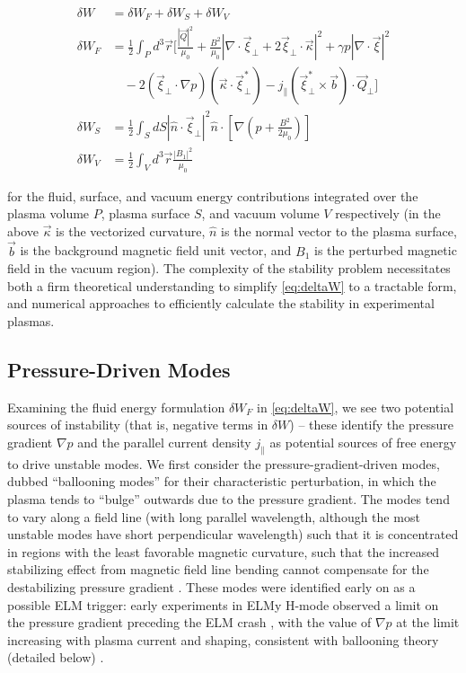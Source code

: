 \begin{equation}\label{eq:deltaW}
 \begin{aligned}
  \delta W &= \delta W_F + \delta W_S + \delta W_V\\
  \delta W_F &= \frac{1}{2} \int_P d^3 \vec{r} \Bigg[ \frac{|\vec{Q}|^2}{\mu_0} + \frac{B^2}{\mu_0} \left| \nabla \cdot \vec{\xi}_\perp + 2 \vec{\xi}_\perp \cdot \vec{\kappa} \right|^2 + \gamma p \left| \nabla \cdot \vec{\xi} \right|^2\\
  &\quad- 2\left( \vec{\xi}_\perp \cdot \nabla p \right) \left(\vec{\kappa} \cdot \vec{\xi}_\perp^* \right) - j_\parallel \left(\vec{\xi}_\perp^* \times \vec{b} \right) \cdot \vec{Q}_\perp \Bigg]\\
  \delta W_S &= \frac{1}{2} \int_S dS \left| \hat{n} \cdot \vec{\xi}_\perp \right|^2 \hat{n} \cdot \left[ \nabla \left( p + \frac{B^2}{2\mu_0} \right) \right]\\
  \delta W_V &= \frac{1}{2} \int_V d^3 \vec{r} \frac{\left|B_1 \right|^2}{\mu_0}
 \end{aligned}
\end{equation}

\noindent for the fluid, surface, and vacuum energy contributions integrated over the plasma volume $P$, plasma surface $S$, and vacuum volume $V$ respectively (in the above $\vec{\kappa}$ is the vectorized curvature, $\hat{n}$ is the normal vector to the plasma surface, $\vec{b}$ is the background magnetic field unit vector, and $B_1$ is the perturbed magnetic field in the vacuum region).  The complexity of the stability problem necessitates both a firm theoretical understanding to simplify \cref{eq:deltaW} to a tractable form, and numerical approaches to efficiently calculate the stability in experimental plasmas.

\subsection{Pressure-Driven Modes}\label{subsec:mod_balloon}

Examining the fluid energy formulation $\delta W_F$ in \cref{eq:deltaW}, we see two potential sources of instability (that is, negative terms in $\delta W$) -- these identify the pressure gradient $\nabla p$ and the parallel current density $j_\parallel$ as potential sources of free energy to drive unstable modes.  We first consider the pressure-gradient-driven modes, dubbed ``ballooning modes'' for their characteristic perturbation, in which the plasma tends to ``bulge'' outwards due to the pressure gradient.  The modes tend to vary along a field line (with long parallel wavelength, although the most unstable modes have short perpendicular wavelength) such that it is concentrated in regions with the least favorable magnetic curvature, such that the increased stabilizing effect from magnetic field line bending cannot compensate for the destabilizing pressure gradient \cite{Freidberg1987}.  These modes were identified early on as a possible ELM trigger: early experiments in ELMy H-mode observed a limit on the pressure gradient preceding the ELM crash \cite{Kamada1996,Suttrop2000}, with the value of $\nabla p$ at the limit increasing with plasma current and shaping, consistent with ballooning theory (detailed below) \cite{Suttrop2000a}.

